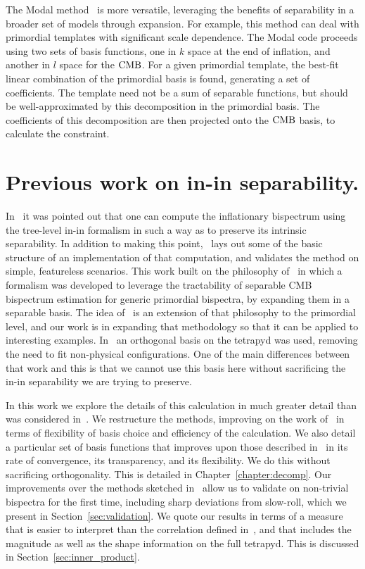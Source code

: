     The Modal method~\cite{FergShell_2014} is more versatile, 
    leveraging the benefits of separability in a broader set of models through expansion.
    For example, this method can deal with primordial templates with significant scale dependence.
    The Modal code proceeds using two sets of basis functions, one in $k$ space at the end
    of inflation, and another in $l$ space for the $\text{CMB}$.
    For a given primordial template, the best-fit linear combination of the primordial basis
    is found, generating a set of coefficients.
    The template need not be a sum of separable functions, but should be well-approximated by this
    decomposition in the primordial basis.
    The coefficients of this decomposition are then projected onto the $\text{CMB}$ basis, to calculate the constraint.


\section{Previous work on in-in separability.}\label{sec:prev_inin}
    In~\cite{Funakoshi} it was pointed out that one can compute the inflationary
    bispectrum using the
tree-level in-in formalism in such a way as to preserve its intrinsic
separability. In addition to making this point,~\cite{Funakoshi} lays
out some of the basic structure of an implementation of that computation,
and validates the method on simple, featureless scenarios.
This work built on the philosophy of~\cite{FergShell_1,FergShell_2,FergShell_3}
in which a formalism was developed to
leverage the tractability of separable CMB bispectrum estimation
for generic primordial bispectra, by expanding them in a separable basis.
The idea of~\cite{Funakoshi} is an extension of that philosophy to the primordial level,
and our work is in expanding that methodology so that it can be applied
to interesting examples.
In~\cite{FergShell_1,FergShell_2,FergShell_3} an orthogonal basis on the tetrapyd was used,
removing the need to fit non-physical configurations.
One of the main differences between that work and this
is that we cannot use this basis here without sacrificing the
in-in separability we are trying to preserve.

In this work we explore the details of this calculation in much greater detail
than was considered in~\cite{Funakoshi}.
We restructure the methods, improving on the work of~\cite{Funakoshi} in terms
of flexibility of basis choice and efficiency of the calculation.
We also detail a particular set of basis functions that improves upon those described
in~\cite{Funakoshi} in its rate of convergence, its transparency,
and its flexibility.
We do this without sacrificing orthogonality.
This is detailed in Chapter~\ref{chapter:decomp}.
Our improvements over the methods sketched in~\cite{Funakoshi} allow us to validate
on non-trivial bispectra for the first time, including sharp deviations from slow-roll, which we present in
Section~\ref{sec:validation}.
We quote our results in terms of a measure that is
easier to interpret than the correlation defined in~\cite{Funakoshi},
and that includes the magnitude as well as the shape information
on the full tetrapyd.
This is discussed in Section~\ref{sec:inner_product}.


